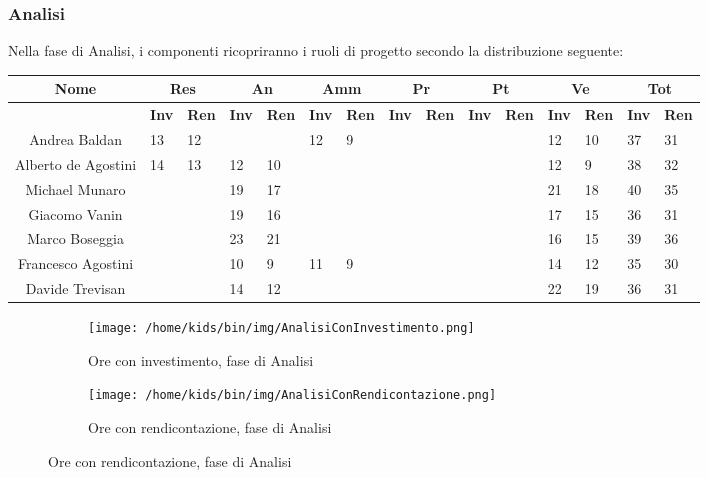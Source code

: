 \documentclass{scalatekids-article}
\begin{document}
\subsubsection{Analisi}
Nella fase di Analisi, i componenti ricopriranno i ruoli di progetto secondo la distribuzione seguente:
\begin{center}
  \scriptsize
  \begin{tabular}{| c | p{0.35cm} p{0.35cm} | p{0.35cm} p{0.35cm} | p{0.35cm} p{0.35cm} | p{0.35cm} p{0.35cm} | p{0.35cm} p{0.35cm} | p{0.35cm} p{0.35cm} | p{0.35cm} p{0.35cm} |}
    \hline
    \textbf{Nome} & \multicolumn{2}{|c|}{\textbf{Res}} & \multicolumn{2}{|c|}{\textbf{An}} & \multicolumn{2}{|c|}{\textbf{Amm}} & \multicolumn{2}{|c|}{\textbf{Pr}} & \multicolumn{2}{|c|}{\textbf{Pt}} & \multicolumn{2}{|c|}{\textbf{Ve}} & \multicolumn{2}{|c|}{\textbf{Tot}}\\
    \hline
    & \textbf{Inv} & \textbf{Ren} & \textbf{Inv} & \textbf{Ren} & \textbf{Inv} & \textbf{Ren} & \textbf{Inv} & \textbf{Ren} & \textbf{Inv} & \textbf{Ren} & \textbf{Inv} & \textbf{Ren} & \textbf{Inv} & \textbf{Ren}\\
    \hline
    Andrea Baldan & 13 & 12 & & & 12 & 9 & & & & & 12 & 10 & 37 & 31\\
    Alberto de Agostini & 14 & 13 & 12 & 10 & & & & & & & 12 & 9 & 38 & 32\\
    Michael Munaro & & & 19 & 17 & & & & & & & 21 & 18 & 40 & 35\\
    Giacomo Vanin & & & 19 & 16 & & & & & & & 17 & 15 & 36 & 31\\
    Marco Boseggia & & & 23 & 21 & & & & & & & 16 & 15 & 39 & 36\\
    Francesco Agostini & & & 10 & 9 & 11 & 9 & & & & & 14 & 12 & 35 & 30\\
    Davide Trevisan & & & 14 & 12 & & & & & & & 22 & 19 & 36 & 31\\
    \hline
  \end{tabular}
\end{center}
\begin{figure}[H]
  \begin{subfigure}[H]{0.47\textwidth}
    \texttt{[image: /home/kids/bin/img/AnalisiConInvestimento.png]}
    \caption{Ore con investimento, fase di Analisi}
  \end{subfigure}
  \qquad
  \begin{subfigure}[H]{0.47\textwidth}
    \texttt{[image: /home/kids/bin/img/AnalisiConRendicontazione.png]}
    \caption{Ore con rendicontazione, fase di Analisi}
  \end{subfigure}
\end{figure}
\end{document}
